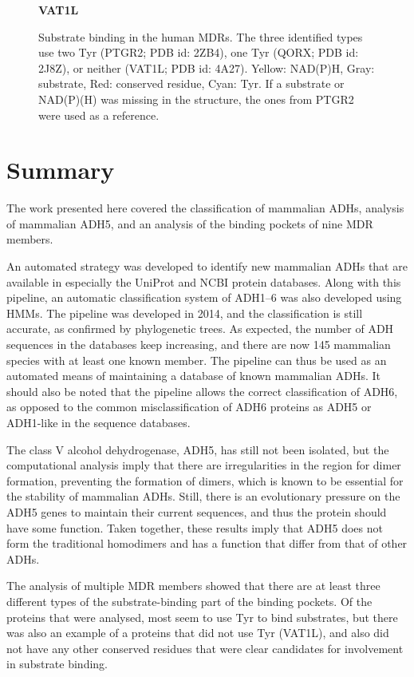 \documentclass[a4paper, twoside, 12pt, openright]{report}
\begin{document}
\begin{figure}[htbp]
 {\bf VAT1L}\\
 \caption{Substrate binding in the human MDRs. The three identified types use two Tyr (PTGR2; PDB id: 2ZB4), one Tyr (QORX; PDB id: 2J8Z), or neither (VAT1L; PDB id: 4A27). Yellow: NAD(P)H, Gray: substrate, Red: conserved residue, Cyan: Tyr. If a substrate or NAD(P)(H) was missing in the structure, the ones from PTGR2 were used as a reference.}
 \label{fig:mdr_subst_bind}
\end{figure}


\section{Summary}
\label{sec:summary}

The work presented here covered the classification of mammalian ADHs, analysis of mammalian ADH5, and an analysis of the binding pockets of nine MDR members.

An automated strategy was developed to identify new mammalian ADHs that are available in especially the UniProt and NCBI protein databases. Along with this pipeline, an automatic classification system of ADH1--6 was also developed using HMMs. The pipeline was developed in 2014, and the classification is still accurate, as confirmed by phylogenetic trees. As expected, the number of ADH sequences in the databases keep increasing, and there are now 145 mammalian species with at least one known member. The pipeline can thus be used as an automated means of maintaining a database of known mammalian ADHs. It should also be noted that the pipeline allows the correct classification of ADH6, as opposed to the common misclassification of ADH6 proteins as ADH5 or ADH1-like in the sequence databases.

The class V alcohol dehydrogenase, ADH5, has still not been isolated, but the computational analysis imply that there are irregularities in the region for dimer formation, preventing the formation of dimers, which is known to be essential for the stability of mammalian ADHs. Still, there is an evolutionary pressure on the ADH5 genes to maintain their current sequences, and thus the protein should have some function. Taken together, these results imply that ADH5 does not form the traditional homodimers and has a function that differ from that of other ADHs.

The analysis of multiple MDR members showed that there are at least three different types of the substrate-binding part of the binding pockets. Of the proteins that were analysed, most seem to use Tyr to bind substrates, but there was also an example of a proteins that did not use Tyr (VAT1L), and also did not have any other conserved residues that were clear candidates for involvement in substrate binding.
\end{document}
